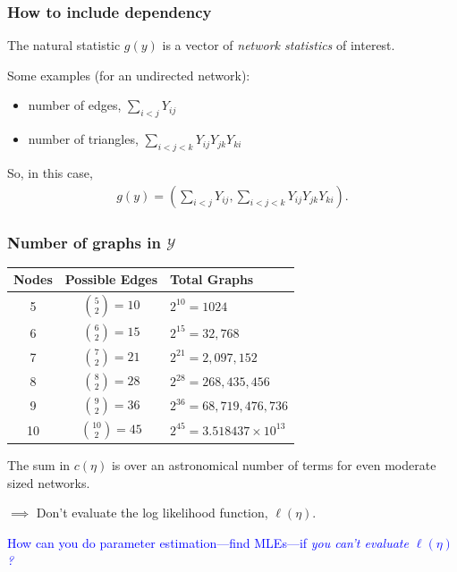\documentclass[ 10pt]{beamer}
\def\YY{{\mathcal Y}}
\begin{document}
\frame
{
\frametitle{How to include dependency}
The natural statistic $g(y)$ is a vector of \emph{network statistics} of interest.  
\vspace{2mm}

Some examples (for an undirected network):
\begin{itemize}
	\item number of edges, $\sum_{i<j} Y_{ij}$
	\item number of triangles, $\sum_{i < j < k} Y_{ij}Y_{jk}Y_{ki}$
\end{itemize}
\vspace{2mm}

So, in this case,
\begin{align*}
	g(y) = \left( \sum_{i<j} Y_{ij}, 
					\sum_{i < j < k} Y_{ij}Y_{jk}Y_{ki} \right ).
\end{align*}
}


\frame
{
\frametitle{Number of graphs in $\YY$}
\begin{table}[h] 

\begin{tabular}{ccl} 
\hline 
Nodes & Possible Edges & Total Graphs \\ [1ex]
\hline
5 & ${5 \choose 2} = 10$ & $2^{10} = 1024$ \\ [1ex]
6 & ${6 \choose 2} = 15$ & $2^{15} = 32,768$ \\ [1ex]
7 & ${7 \choose 2} = 21$ & $2^{21} = 2,097,152$ \\ [1ex]
8 & ${8 \choose 2} = 28$ & $2^{28} = 268,435,456$ \\ [1ex]
9 & ${9 \choose 2} = 36$ & $2^{36} = 68,719,476,736$ \\ [1ex]
10 & ${10 \choose 2} = 45$ & $2^{45} = 3.518437\times10^{13}$ \\ [1ex]
\hline 
\end{tabular} \label{T:number graphs}
\end{table}
\pause

The sum in $c(\eta)$ is over an astronomical number of terms for 
even moderate sized networks.
\vspace{1mm}

$\implies$ Don't evaluate the log likelihood function, $\ell(\eta)$.

\vspace{3mm}

\pause
\textcolor{blue}{How can you do parameter estimation---find MLEs---if \emph{you can't 
evaluate $\ell(\eta)$?} }
}
\end{document}
